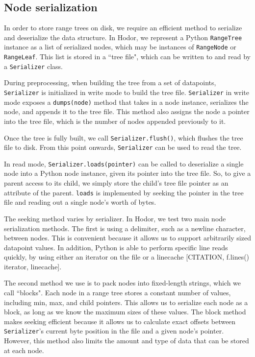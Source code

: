 \documentclass[11pt, oneside]{article}
\begin{document}
\subsection{Node serialization}

In order to store range trees on disk, we require an efficient method to
serialize and deserialize the data structure. In Hodor, we represent a Python
\texttt{RangeTree} instance as a list of serialized nodes, which may be
instances of \texttt{RangeNode} or \texttt{RangeLeaf}. This list is stored in a
``tree file", which can be written to and read by a \texttt{Serializer} class. 

During preprocessing, when building the tree from a set of datapoints,
\texttt{Serializer} is initialized in write mode to build the tree file.
\texttt{Serializer} in write mode exposes a \texttt{dumps(node)} method that
takes in a node instance, serializes the node, and appends it to the tree file.
This method also assigns the node a pointer into the tree file, which
is the number of nodes appended previously to it. 

Once the tree is fully built, we call \texttt{Serializer.flush()}, which
flushes the tree file to disk. From this point onwards, \texttt{Serializer} can
be used to read the tree.

In read mode, \texttt{Serializer.loads(pointer)} can be called to deserialize a
single node into a Python node instance, given its pointer into the tree file.
So, to give a parent access to its child, we simply store the child's tree file
pointer as an attribute of the parent. \texttt{loads} is implemented by seeking
the pointer in the tree file and reading out a single node's worth of bytes.

The seeking method varies by serializer. In Hodor, we test two main node
serialization methods. The first is using a delimiter, such as a newline
character, between nodes. This is convenient because it allows us to support
arbitrarily sized datapoint values. In addition, Python is able to perform
specific line reads quickly, by using either an iterator on the file or a
linecache [CITATION, f.lines() iterator, linecache]. 

The second method we use is to pack nodes into fixed-length strings, which we
call ``blocks". Each node in a range tree stores a constant number of values,
including min, max, and child pointers. This allows us to serialize each node
as a block, as long as we know the maximum sizes of these values. The block
method makes seeking efficient because it allows us to calculate exact offsets
between \texttt{Serializer}'s current byte position in the file and a given
node's pointer. However, this method also limits the amount and type of data
that can be stored at each node. 
\end{document}
